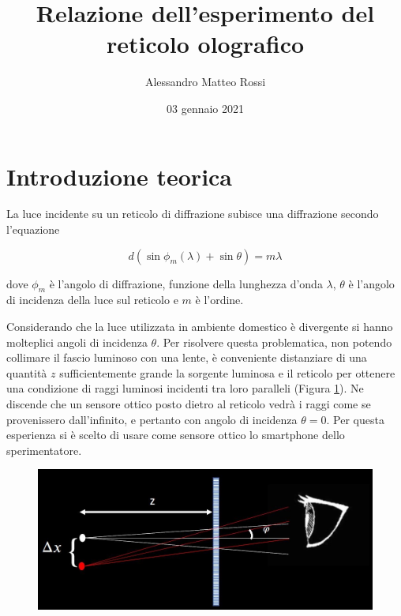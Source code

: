 \documentclass{article}
\title{Relazione dell'esperimento del reticolo olografico}
\author{Alessandro Matteo Rossi}
\date{03 gennaio 2021}
\begin{document}
\maketitle

\begingroup
{}
\begin{abstract}
    \centering
\end{abstract}
\endgroup



\tableofcontents
\newpage

\section{Introduzione teorica}

La luce incidente su un reticolo di diffrazione subisce una diffrazione secondo l'equazione

\begin{equation}
    d(\sin\phi _m(\lambda)+\sin\theta) = m \lambda
    \label{}
\end{equation}

dove $\phi_m$ è l'angolo di diffrazione, funzione della lunghezza d'onda $\lambda$, $\theta$ è l'angolo di incidenza della luce sul reticolo e $m$ è l'ordine. 

\vspace{3mm}

Considerando che la luce utilizzata in ambiente domestico è divergente si hanno molteplici angoli di incidenza $\theta$. Per risolvere questa problematica, non potendo collimare il fascio luminoso con una lente, è conveniente distanziare di una quantità $z$ sufficientemente grande la sorgente luminosa e il reticolo per ottenere una condizione di raggi luminosi incidenti tra loro paralleli (Figura \ref{Schema_Diffrazione}). Ne discende che un sensore ottico posto dietro al reticolo vedrà i raggi come se provenissero dall'infinito, e pertanto con angolo di incidenza $\theta = 0$. Per questa esperienza si è scelto di usare come sensore ottico lo smartphone dello sperimentatore.

\begin{figure}[h]
    \centering
    \includegraphics[width=0.55\linewidth]{Schema_Diffrazione.JPG}
    \label{Schema_Diffrazione}
\end{figure}
\end{document}
